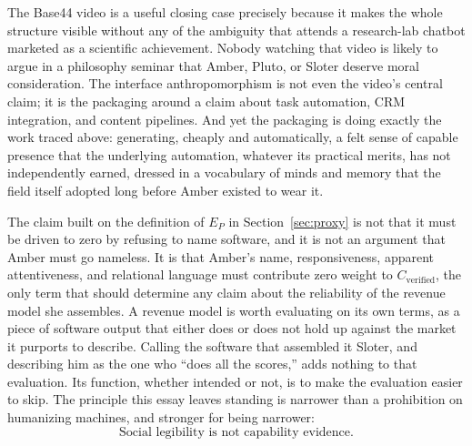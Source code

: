 \documentclass[11pt]{article}
\begin{document}
The Base44 video is a useful closing case precisely because it makes the whole structure visible without any of the ambiguity that attends a research-lab chatbot marketed as a scientific achievement. Nobody watching that video is likely to argue in a philosophy seminar that Amber, Pluto, or Sloter deserve moral consideration. The interface anthropomorphism is not even the video's central claim; it is the packaging around a claim about task automation, CRM integration, and content pipelines. And yet the packaging is doing exactly the work traced above: generating, cheaply and automatically, a felt sense of capable presence that the underlying automation, whatever its practical merits, has not independently earned, dressed in a vocabulary of minds and memory that the field itself adopted long before Amber existed to wear it.

The claim built on the definition of $E_P$ in Section~\ref{sec:proxy} is not that it must be driven to zero by refusing to name software, and it is not an argument that Amber must go nameless. It is that Amber's name, responsiveness, apparent attentiveness, and relational language must contribute zero weight to $C_{\mathrm{verified}}$, the only term that should determine any claim about the reliability of the revenue model she assembles. A revenue model is worth evaluating on its own terms, as a piece of software output that either does or does not hold up against the market it purports to describe. Calling the software that assembled it Sloter, and describing him as the one who ``does all the scores,'' adds nothing to that evaluation. Its function, whether intended or not, is to make the evaluation easier to skip. The principle this essay leaves standing is narrower than a prohibition on humanizing machines, and stronger for being narrower:
\[
\text{Social legibility is not capability evidence.}
\]
\end{document}
